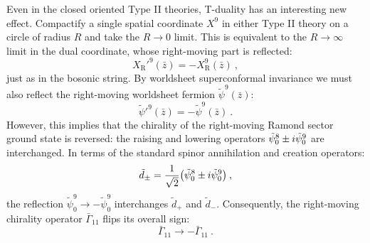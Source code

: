 Even in the closed oriented Type II theories, T-duality has an interesting new effect. Compactify a single spatial coordinate $X^9$ in either Type II theory on a circle of radius $R$ and take the $R \to 0$ limit. This is equivalent to the $R \to \infty$ limit in the dual coordinate, whose right-moving part is reflected:
\begin{equation}
	X_{\mathrm{R}}'^9(\bar{z}) = -X_{\mathrm{R}}^9(\bar{z}) \:, \label{13.1.1}
\end{equation}
just as in the bosonic string. By worldsheet superconformal invariance we must also reflect the right-moving worldsheet fermion $\tilde{\psi}^9(\bar{z})$:
\begin{equation}
	\tilde{\psi}'^9(\bar{z}) = -\tilde{\psi}^9(\bar{z}) \:. \label{13.1.2}
\end{equation}
However, this implies that the chirality of the right-moving Ramond sector ground state is reversed: the raising and lowering operators $\tilde{\psi}_0^8 \pm i\tilde{\psi}_0^9$ are interchanged. In terms of the standard spinor annihilation and creation operators:
\[
\tilde{d}_{\pm} = \frac{1}{\sqrt{2}}\bigl(\tilde{\psi}_0^8 \pm i\tilde{\psi}_0^9\bigr) \:,
\]
the reflection $\tilde{\psi}_0^9 \to -\tilde{\psi}_0^9$ interchanges $\tilde{d}_{+}$ and $\tilde{d}_{-}$. Consequently, the right-moving chirality operator $\bar{\Gamma}_{11}$ flips its overall sign:
\[
\bar{\Gamma}_{11} \longrightarrow -\bar{\Gamma}_{11} \:.
\]
